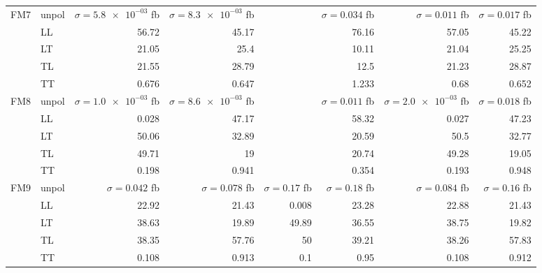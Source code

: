 \begin{table}[h]
{\begin{tabular}{llrrrrrr}
\midrule
\multirow{5}{*}{FM7}
 & unpol & $\sigma = \num{5.8e-03}$ fb & $\sigma = \num{8.3e-03}$ fb &  & $\sigma = \num{0.034}$ fb & $\sigma = \num{0.011}$ fb & $\sigma = \num{0.017}$ fb \\
 & LL & \num{56.72} & \num{45.17} &  & \num{76.16} & \num{57.05} & \num{45.22} \\
 & LT & \num{21.05} & \num{25.4} &  & \num{10.11} & \num{21.04} & \num{25.25} \\
 & TL & \num{21.55} & \num{28.79} &  & \num{12.5} & \num{21.23} & \num{28.87} \\
 & TT & \num{0.676} & \num{0.647} &  & \num{1.233} & \num{0.68} & \num{0.652} \\
\midrule
\multirow{5}{*}{FM8}
 & unpol & $\sigma = \num{1.0e-03}$ fb & $\sigma = \num{8.6e-03}$ fb &  & $\sigma = \num{0.011}$ fb & $\sigma = \num{2.0e-03}$ fb & $\sigma = \num{0.018}$ fb \\
 & LL & \num{0.028} & \num{47.17} &  & \num{58.32} & \num{0.027} & \num{47.23} \\
 & LT & \num{50.06} & \num{32.89} &  & \num{20.59} & \num{50.5} & \num{32.77} \\
 & TL & \num{49.71} & \num{19} &  & \num{20.74} & \num{49.28} & \num{19.05} \\
 & TT & \num{0.198} & \num{0.941} &  & \num{0.354} & \num{0.193} & \num{0.948} \\
\midrule
\multirow{5}{*}{FM9}
 & unpol & $\sigma = \num{0.042}$ fb & $\sigma = \num{0.078}$ fb & $\sigma = \num{0.17}$ fb & $\sigma = \num{0.18}$ fb & $\sigma = \num{0.084}$ fb & $\sigma = \num{0.16}$ fb \\
 & LL & \num{22.92} & \num{21.43} & \num{0.008} & \num{23.28} & \num{22.88} & \num{21.43} \\
 & LT & \num{38.63} & \num{19.89} & \num{49.89} & \num{36.55} & \num{38.75} & \num{19.82} \\
 & TL & \num{38.35} & \num{57.76} & \num{50} & \num{39.21} & \num{38.26} & \num{57.83} \\
 & TT & \num{0.108} & \num{0.913} & \num{0.1} & \num{0.95} & \num{0.108} & \num{0.912} \\
\bottomrule
\end{tabular}
}%
\end{table}